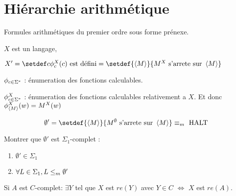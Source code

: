 \section{Hiérarchie arithmétique}


Formules arithmétiques du premier ordre sous forme prénexe.


\begin{definition}
	$X$ est un langage,

	$X' = \setdef c {\phi_c^X(c) \text{ est défini}} = \setdef {\encode M} {M^X \text{ s'arrete sur } \encode M}$

	$\phi_{c \in \Sigma^{*}}$ : énumeration des fonctions calculables.

	$\phi_{c \in \Sigma^{*}}^X$ : énumeration des fonctions calculables relativement a $X$. Et donc $\phi_{\left\langle M\right\rangle}^X(w) = M^X(w)$
\end{definition}


\begin{exemple}
	$$\emptyset' = \setdef {\encode M} {M^{\emptyset} \text{ s'arrete sur } \encode M} \equivm \halt$$
\end{exemple}

\begin{exercice}
	Montrer que $\emptyset '$ est $\Sigma_1$-complet :
	\begin{enumerate}
		\item $\emptyset' \in \Sigma_1$
		\item $\forall L \in \Sigma_1, L \leq_m \emptyset'$
	\end{enumerate}
\end{exercice}


\begin{lemma}
	Si $A$ est $C$-complet:  $\exists Y$ tel que $X$ est $re(Y)$ avec $Y \in C$ $\iff$ $X$ est $re(A)$.
\end{lemma}

